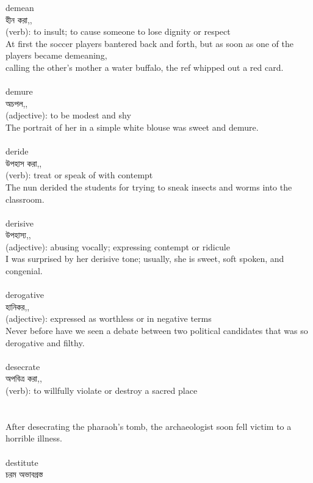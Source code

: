 \documentclass{article}
\begin{document}
{demean}\\
{হীন করা,,}\\
{(verb): to insult; to cause someone to lose dignity or respect\\At first the soccer players bantered back and forth, but as soon as one of the players became demeaning,\\calling the other's mother a water buffalo, the ref whipped out a red card.\\}\\
{demure}\\
{অচপল,,}\\
{(adjective): to be modest and shy\\The portrait of her in a simple white blouse was sweet and demure.\\}\\
{deride}\\
{উপহাস করা,,}\\
{(verb): treat or speak of with contempt\\The nun derided the students for trying to sneak insects and worms into the classroom.\\}\\
{derisive}\\
{উপহাস্য,,}\\
{(adjective): abusing vocally; expressing contempt or ridicule\\I was surprised by her derisive tone; usually, she is sweet, soft spoken, and congenial.\\}\\
{derogative}\\
{হানিকর,,}\\
{(adjective): expressed as worthless or in negative terms\\Never before have we seen a debate between two political candidates that was so derogative and filthy.\\}\\
{desecrate}\\
{অপবিত্র করা,,}\\
{(verb): to willfully violate or destroy a sacred place\\\\                                                                                \\After desecrating the pharaoh's tomb, the archaeologist soon fell victim to a horrible illness.\\}\\
{destitute}\\
{চরম অভাবগ্রস্ত}\\
\end{document}
